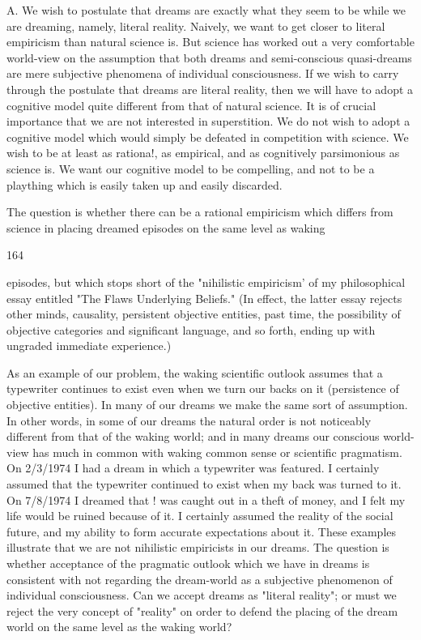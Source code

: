 \documentclass[10pt,twoside]{memoir}
\begin{document}
\begin{enumerate}
{\begin{enumerate}
\begin{sysrules}
\begin{sysrules}
\begin{sysrules}
\begin{sysrules}
{\begin{enumerate}
{{{{{{{A. We wish to postulate that dreams are exactly what they seem to be 
while we are dreaming, namely, literal reality. Naively, we want to get closer 
to literal empiricism than natural science is. But science has worked out a 
very comfortable world-view on the assumption that both dreams and 
semi-conscious quasi-dreams are mere subjective phenomena of individual 
consciousness. If we wish to carry through the postulate that dreams are 
literal reality, then we will have to adopt a cognitive model quite different 
from that of natural science. It is of crucial importance that we are not 
interested in superstition. We do not wish to adopt a cognitive model which 
would simply be defeated in competition with science. We wish to be at least 
as rationa!, as empirical, and as cognitively parsimonious as science is. We 
want our cognitive model to be compelling, and not to be a plaything which 
is easily taken up and easily discarded. 

The question is whether there can be a rational empiricism which 
differs from science in placing dreamed episodes on the same level as waking 


164 


episodes, but which stops short of the "nihilistic empiricism' of my 
philosophical essay entitled "The Flaws Underlying Beliefs." (In effect, the 
latter essay rejects other minds, causality, persistent objective entities, past 
time, the possibility of objective categories and significant language, and so 
forth, ending up with ungraded immediate experience.) 

As an example of our problem, the waking scientific outlook assumes 
that a typewriter continues to exist even when we turn our backs on it 
(persistence of objective entities). In many of our dreams we make the same 
sort of assumption. In other words, in some of our dreams the natural order 
is not noticeably different from that of the waking world; and in many 
dreams our conscious world-view has much in common with waking 
common sense or scientific pragmatism. On 2/3/1974 I had a dream in which 
a typewriter was featured. I certainly assumed that the typewriter continued 
to exist when my back was turned to it. On 7/8/1974 I dreamed that ! was 
caught out in a theft of money, and I felt my life would be ruined because of 
it. I certainly assumed the reality of the social future, and my ability to form 
accurate expectations about it. These examples illustrate that we are not 
nihilistic empiricists in our dreams. The question is whether acceptance of 
the pragmatic outlook which we have in dreams is consistent with not 
regarding the dream-world as a subjective phenomenon of individual 
consciousness. Can we accept dreams as "literal reality"; or must we reject 
the very concept of "reality" on order to defend the placing of the dream 
world on the same level as the waking world? 

}}}}}}}
\end{enumerate}}
\end{sysrules}
\end{sysrules}
\end{sysrules}
\end{sysrules}
\end{enumerate}}
\end{enumerate}
\end{document}
